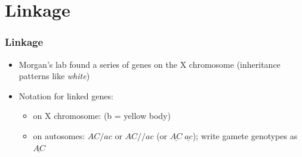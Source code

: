 \section{Linkage}

\begin{frame}[t]
    \frametitle{Linkage}
    \begin{itemize}
        \item Morgan's lab found a series of genes on the X chromosome
            (inheritance patterns like \textit{white})

        \item Notation for linked genes:

            \begin{itemize}
                \item on X chromosome:  (b = yellow body)

                \item on autosomes: $AC/ac$ or $AC//ac$ (or $\underline{AC} \;
                    \underline{ac}$); write gamete genotypes as
                    $\underline{AC}$
            \end{itemize}
    \end{itemize}
\end{frame}




\begin{noheadline}
\begin{frame}
    \begin{clickerquestion}
        \item 
        \begin{clickeroptions}
            \item 
            \item 
            \item 
            \item 
        \end{clickeroptions}
    \end{clickerquestion}
\end{frame}
\end{noheadline}
